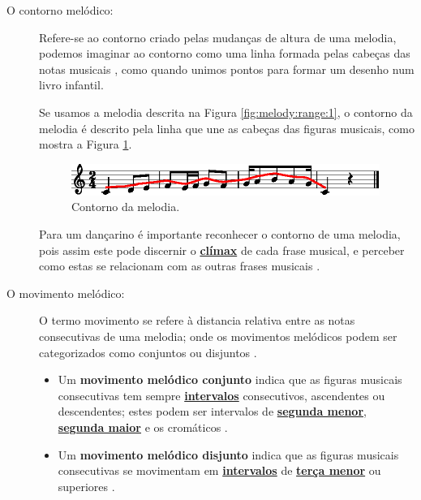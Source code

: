 \begin{description}
\item[O contorno melódico:] 
\label{ref:melodica:shape}
Refere-se ao contorno criado pelas mudanças de altura de uma melodia,
podemos imaginar ao contorno como uma linha formada pelas cabeças das notas musicais 
\cite[pp. 44]{holland2013music} \cite[pp. 61]{chazin2016teaching} \cite[pp. 50]{langer2017theory},
como quando unimos pontos para formar um desenho num livro infantil.


\begin{example}
Se usamos a melodia descrita na Figura \ref{fig:melody:range:1}, 
o contorno da melodia é descrito pela linha que une as cabeças das figuras musicais,
como mostra a Figura \ref{fig:melody:shape:1}.
\end{example}
\begin{figure}[!h]
\centering
\includegraphics[width=0.99\textwidth]{chapters/cap-musicalidade-percepcion/melodia-carateristicas-shape.eps}
\caption{Contorno da melodia.}
\label{fig:melody:shape:1}
\end{figure}

Para um dançarino é importante reconhecer o contorno de uma melodia, 
pois assim este pode discernir o \hyperref[ref:climax]{\textbf{clímax}} de cada frase musical, 
e perceber como estas se relacionam com as outras frases musicais
\cite[pp. 45]{holland2013music}.

\item[O movimento melódico:]
\label{ref:melodica:movimento}
O termo movimento se refere à distancia relativa entre as notas consecutivas de uma melodia;
onde os movimentos melódicos podem ser categorizados como conjuntos ou disjuntos 
\cite[pp. 52]{langer2017theory} \cite[pp. 165]{reinato2010musicavol1} \cite[pp. 45]{holland2013music}. 
\begin{itemize}
\item Um \textbf{movimento melódico conjunto} indica 
\label{ref:melodica:movimento:conjunto}
que as figuras musicais consecutivas
tem sempre \hyperref[sec:intervalomelodico]{\textbf{intervalos}} consecutivos,
ascendentes ou descendentes; estes podem ser intervalos de 
\hyperref[tab:intervalomelodico2]{\textbf{segunda menor}},
\hyperref[tab:intervalomelodico2]{\textbf{segunda maior}} e
os cromáticos  \cite[pp. 165]{reinato2010musicavol1} \cite[pp. 52]{langer2017theory}.  
\item Um \textbf{movimento melódico disjunto} indica 
\label{ref:melodica:movimento:disjunto}
que as figuras musicais consecutivas
se movimentam em \hyperref[sec:intervalomelodico]{\textbf{intervalos}} 
de \hyperref[tab:intervalomelodico2]{\textbf{terça menor}} ou superiores 
\cite[pp. 166]{reinato2010musicavol1} \cite[pp. 53]{langer2017theory}.
\end{itemize}~


\end{description}
